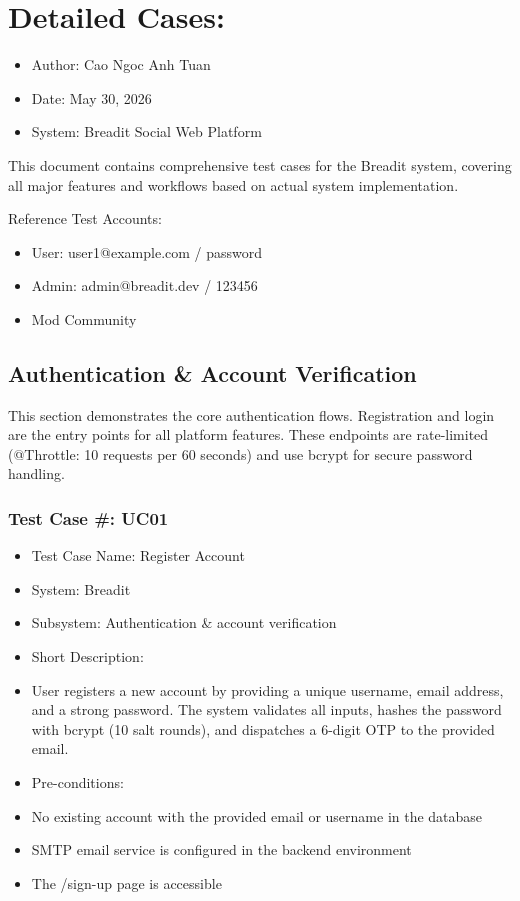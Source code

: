 
\section{Detailed Cases:}
\begin{itemize}
  \item Author: Cao Ngoc Anh Tuan
  \item Date: May 30, 2026
  \item System: Breadit Social Web Platform
\end{itemize}

This document contains comprehensive test cases for the Breadit system, covering all major features and workflows based on actual system implementation.

Reference Test Accounts:
\begin{itemize}
  \item User:     user1@example.com / password
  \item Admin:    admin@breadit.dev / 123456
  \item Mod Community
\end{itemize}

\subsection{Authentication \& Account Verification}

This section demonstrates the core authentication flows. Registration and login are the entry points for all platform features. These endpoints are rate-limited (@Throttle: 10 requests per 60 seconds) and use bcrypt for secure password handling.

\subsubsection{Test Case \#: UC01}
\begin{itemize}
  \item Test Case Name: Register Account
  \item System: Breadit
  \item Subsystem: Authentication \& account verification
  \item Short Description:
  \item User registers a new account by providing a unique username, email address, and a strong password. The system validates all inputs, hashes the password with bcrypt (10 salt rounds), and dispatches a 6-digit OTP to the provided email.
  \item Pre-conditions:
  \item No existing account with the provided email or username in the database
  \item SMTP email service is configured in the backend environment
  \item The /sign-up page is accessible
\end{itemize}

